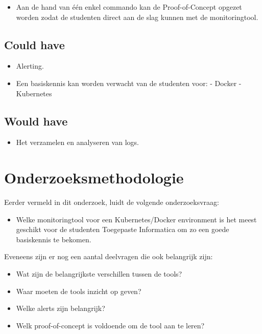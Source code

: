 \begin{itemize}
    \item Aan de hand van één enkel commando kan de Proof-of-Concept opgezet worden zodat de studenten direct aan de slag kunnen met de monitoringtool.
\end{itemize}

\subsection{Could have}

\begin{itemize}
    \item Alerting.
    \item Een basiskennis kan worden verwacht van de studenten voor:
    \subitem - Docker
    \subitem - Kubernetes
\end{itemize}

\subsection{Would have}

\begin{itemize}
    \item Het verzamelen en analyseren van logs. 
\end{itemize}
\clearpage
\section{Onderzoeksmethodologie}

Eerder vermeld in dit onderzoek, luidt de volgende onderzoeksvraag:

\begin{itemize}
    \item Welke monitoringtool voor een Kubernetes/Docker environment is het meest geschikt voor de studenten Toegepaste Informatica om zo een goede basiskennis te bekomen.
\end{itemize}

Eveneens zijn er nog een aantal deelvragen die ook belangrijk zijn:

\begin{itemize}
    \item Wat zijn de belangrijkste verschillen tussen de tools?
    \item Waar moeten de tools inzicht op geven?
    \item Welke alerts zijn belangrijk?
    \item Welk proof-of-concept is voldoende om de tool aan te leren?
\end{itemize}

